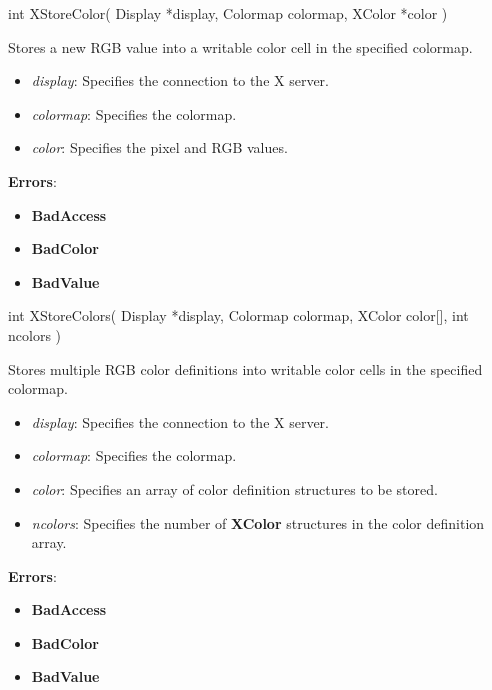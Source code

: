\documentclass{report}
\begin{document}
\begin{itemize}
            \begin{cppcode}
                int XStoreColor(
                    Display *display,
                    Colormap colormap,
                    XColor *color
                )
            \end{cppcode}
            \bigbreak \noindent
            Stores a new RGB value into a writable color cell in the specified colormap.
            \begin{itemize}
                \item \textit{display}: Specifies the connection to the X server.
                \item \textit{colormap}: Specifies the colormap.
                \item \textit{color}: Specifies the pixel and RGB values.
            \end{itemize}
            \bigbreak \noindent
            \textbf{Errors}:
            \begin{itemize}
                \item \textbf{BadAccess}
                \item \textbf{BadColor}
                \item \textbf{BadValue}
            \end{itemize}

            \begin{cppcode}
                int XStoreColors(
                    Display *display,
                    Colormap colormap,
                    XColor color[],
                    int ncolors
                )
            \end{cppcode}
            \bigbreak \noindent
            Stores multiple RGB color definitions into writable color cells in the specified colormap.
            \begin{itemize}
                \item \textit{display}: Specifies the connection to the X server.
                \item \textit{colormap}: Specifies the colormap.
                \item \textit{color}: Specifies an array of color definition structures to be stored.
                \item \textit{ncolors}: Specifies the number of \textbf{XColor} structures in the color definition array.
            \end{itemize}
            \bigbreak \noindent
            \textbf{Errors}:
            \begin{itemize}
                \item \textbf{BadAccess}
                \item \textbf{BadColor}
                \item \textbf{BadValue}
            \end{itemize}


\end{itemize}
\end{document}
